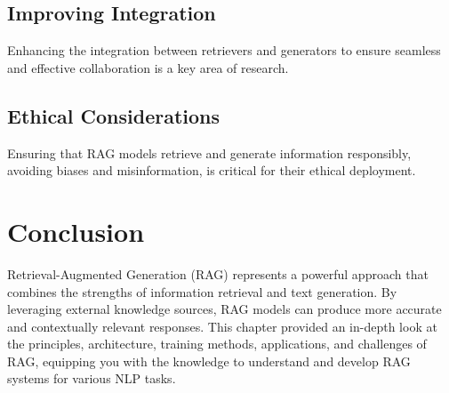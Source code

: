 \subsection{Improving Integration}
Enhancing the integration between retrievers and generators to ensure seamless and effective collaboration is a key area of research.

\subsection{Ethical Considerations}
Ensuring that RAG models retrieve and generate information responsibly, avoiding biases and misinformation, is critical for their ethical deployment.

\section{Conclusion}
Retrieval-Augmented Generation (RAG) represents a powerful approach that combines the strengths of information retrieval and text generation. By leveraging external knowledge sources, RAG models can produce more accurate and contextually relevant responses. This chapter provided an in-depth look at the principles, architecture, training methods, applications, and challenges of RAG, equipping you with the knowledge to understand and develop RAG systems for various NLP tasks.

% 
% 